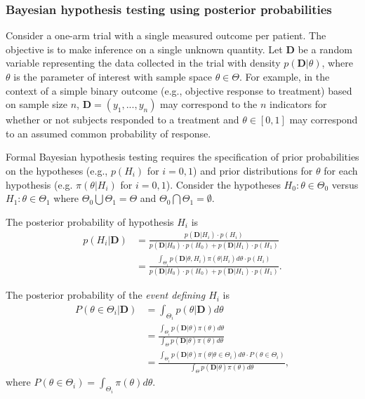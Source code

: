 \documentclass[12pt]{article}
\begin{document}
\subsubsection{Bayesian hypothesis testing using posterior probabilities}
Consider a one-arm trial with a single measured outcome per patient. The objective is to make inference on a single unknown quantity. Let $\mathbf{D}$ be a random variable representing the data collected in the trial with density $p(\mathbf{D}|\theta)$, where $\theta$ is the parameter of interest with sample space $\theta\in\Theta$. 
%
For example, in the context of a simple binary outcome (e.g., objective response to treatment) based on sample size $n$, $\mathbf{D} = \left(y_1,...,y_n\right)$ may correspond to the $n$ indicators for whether or not subjects responded to a treatment and $\theta\in[0,1]$ may correspond to an assumed common probability of response.

Formal Bayesian hypothesis testing requires the specification of prior probabilities on the hypotheses (e.g., $p(H_i)$ for $i=0,1$)
and prior distributions for $\theta$ for each hypothesis (e.g. $\pi\left(\theta \big| H_i\right)$ for $i=0,1$). 
%
Consider the hypotheses $H_0:\theta\in\Theta_{0}$ versus $H_1:\theta\in\Theta_{1}$ where $\Theta_{0}\bigcup \Theta_{1} = \Theta$ and $\Theta_{0} \bigcap \Theta_{1} = \emptyset$. 

The posterior probability of hypothesis $H_i$ is 
\begin{align}
p(H_i|\mathbf{D})&=\frac{p(\mathbf{D}|H_i)\cdot p(H_i)}{p(\mathbf{D}|H_0)\cdot p(H_0)+p(\mathbf{D}|H_1)\cdot p(H_1)}\\
&=\frac{\int_{\Theta_i} p(\mathbf{D}|\theta,H_i)\pi(\theta|H_i)d\theta\cdot p(H_i)}{p(\mathbf{D}|H_0)\cdot p(H_0)+p(\mathbf{D}|H_1)\cdot p(H_1)}.
\end{align}

The posterior probability of the \textit{event defining $H_i$} is
\begin{align}\label{eq:equation1}
P(\theta\in\Theta_i|\mathbf{D})
&=\int_{\Theta_i}p(\theta|\mathbf{D})d\theta\\
&=\frac{\int_{\Theta_i}p(\mathbf{D}|\theta)\pi (\theta)d\theta}{\int_{\Theta}p(\mathbf{D}|\theta)\pi(\theta) d\theta}\\
&=\frac{\int_{\Theta_i}p(\mathbf{D}|\theta)\pi (\theta|\theta\in\Theta_i)d\theta\cdot P(\theta\in\Theta_i)}{\int_{\Theta}p(\mathbf{D}|\theta)\pi(\theta) d\theta},
\end{align}
where $P(\theta\in\Theta_i)=\int_{\Theta_i}\pi(\theta)d\theta$. 
\end{document}
